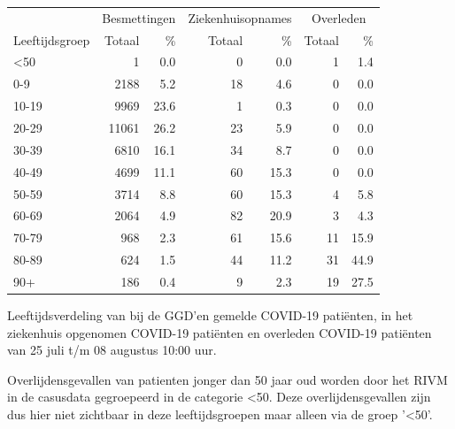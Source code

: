 \documentclass[
  english,
  man,floatsintext]{apa6}
\begin{document}
\begin{table}
\centering\begingroup\fontsize{11}{13}\selectfont

\begin{threeparttable}
\begin{tabular}{lrrrrrr}
\toprule
\multicolumn{1}{c}{ } & \multicolumn{2}{c}{Besmettingen} & \multicolumn{2}{c}{Ziekenhuisopnames} & \multicolumn{2}{c}{Overleden} \\
\cmidrule(l{3pt}r{3pt}){2-3} \cmidrule(l{3pt}r{3pt}){4-5} \cmidrule(l{3pt}r{3pt}){6-7}
Leeftijdsgroep & Totaal & \% & Totaal & \% & Totaal & \%\\
\midrule
<50 & 1 & 0.0 & 0 & 0.0 & 1 & 1.4\\
0-9 & 2188 & 5.2 & 18 & 4.6 & 0 & 0.0\\
10-19 & 9969 & 23.6 & 1 & 0.3 & 0 & 0.0\\
20-29 & 11061 & 26.2 & 23 & 5.9 & 0 & 0.0\\
30-39 & 6810 & 16.1 & 34 & 8.7 & 0 & 0.0\\
40-49 & 4699 & 11.1 & 60 & 15.3 & 0 & 0.0\\
50-59 & 3714 & 8.8 & 60 & 15.3 & 4 & 5.8\\
60-69 & 2064 & 4.9 & 82 & 20.9 & 3 & 4.3\\
70-79 & 968 & 2.3 & 61 & 15.6 & 11 & 15.9\\
80-89 & 624 & 1.5 & 44 & 11.2 & 31 & 44.9\\
90+ & 186 & 0.4 & 9 & 2.3 & 19 & 27.5\\
\bottomrule
\end{tabular}
\begin{tablenotes}
\item[1] Leeftijdsverdeling van bij de GGD’en gemelde COVID-19 patiënten, in het ziekenhuis opgenomen COVID-19 patiënten en overleden COVID-19 patiënten van 25 juli t/m 08 augustus 10:00 uur.
\item[2] Overlijdensgevallen van patienten jonger dan 50 jaar oud worden door het RIVM in de casusdata gegroepeerd in de categorie <50. Deze overlijdensgevallen zijn dus hier niet zichtbaar in deze leeftijdsgroepen maar alleen via de groep '<50'.
\end{tablenotes}
\end{threeparttable}
\endgroup{}
\end{table}

\newpage
\end{document}
